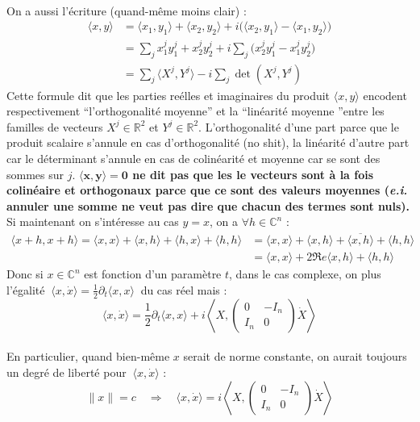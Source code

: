 \documentclass[hidelinks, french, oneside]{article}
\newcommand{\R}{\mathbb{R}}
\newcommand{\C}{\mathbb{C}}
\newcommand{\Lr}{\Longrightarrow}
\renewcommand{\bf}[1]{\boldsymbol{#1}}
\theoremstyle{enonce}
\theoremstyle{special}
\theoremstyle{rqlike}
\theoremstyle{exo}
\theoremstyle{demo}
\begin{document}
\\
On a aussi l'écriture (quand-même moins clair) :
\begin{align*}
\langle x,y \rangle &= \langle x_1, y_1\rangle + \langle x_2, y_2\rangle 
+ i\big(\langle x_2, y_1\rangle - \langle x_1,y_2\rangle\big) \\
	&= \sum_j x^j_1 y^j_1+ x^j_2 y^j_2+ i\sum_j \big( x^j_2 y^j_1 - x^j_1y^j_2 \big) \\
	&= \sum_j \big\langle X^j,Y^j\big\rangle - i\sum_j \det(X^j, Y^j)
\end{align*}
Cette formule dit que les parties reélles et imaginaires du produit $\langle x,y \rangle$ encodent respectivement ``l'orthogonalité moyenne'' et la ``linéarité moyenne ''entre les familles de vecteurs $X^j\in\R^2$ et $Y^j\in\R^2$. L'orthogonalité d'une part parce que le produit scalaire s'annule en cas d'orthogonalité (no shit), la linéarité d'autre part car le déterminant s'annule en cas de colinéarité et moyenne car se sont des sommes sur $j$. \textbf{$\bf{\langle x,y \rangle=0}$ ne dit pas que les le vecteurs sont à la fois colinéaire et orthogonaux parce que ce sont des valeurs moyennes (\textit{e.i.} annuler une somme ne veut pas dire que chacun des termes sont nuls).}
\\

Si maintenant on s'intéresse au cas $y=x$, on a $\forall h\in\C^n$ :
\begin{align*}
\langle x+h, x+h \rangle = \langle x, x \rangle + \langle x, h \rangle + \langle h, x \rangle + \langle h, h \rangle 
	&= \langle x, x \rangle + \langle x, h \rangle  + \overline{\langle x, h \rangle }+ \langle h, h \rangle \\
	&= \langle x, x \rangle + 2\Re e \langle x, h \rangle + \langle h, h \rangle
\end{align*}
Donc si $x\in\C^n$ est fonction d'un paramètre $t$, dans le cas complexe, on plus l'égalité $\ \langle x, \dot{x} \rangle = \frac{1}{2}\partial_t\langle x, x \rangle\ $ du cas réel mais :
\[\langle x, \dot{x} \rangle = \frac{1}{2}\partial_t\langle x, x \rangle + i\left\langle X,\begin{pmatrix} 0 & -I_n \\ I_n & 0 \end{pmatrix}\dot{X}\right\rangle\]
\\
En particulier, quand bien-même $x$ serait de norme constante, on aurait toujours un degré de liberté pour $\ \langle x, \dot{x} \rangle$ :
\[\|x\|=c\quad \Lr\quad \langle x, \dot{x} \rangle = i\left\langle X,\begin{pmatrix} 0 & -I_n \\ I_n & 0 \end{pmatrix}\dot{X}\right\rangle\]
\\
\end{document}
